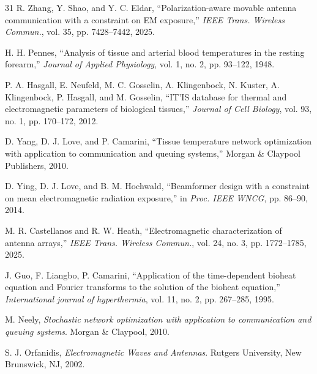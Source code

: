\documentclass[journal]{IEEEtran}
\begin{document}
\begin{thebibliography}{31}
R. Zhang, Y. Shao, and Y. C. Eldar, ``Polarization-aware movable antenna communication with a constraint on EM exposure,'' \emph{IEEE Trans. Wireless Commun.}, vol. 35, pp. 7428--7442, 2025.

H. H. Pennes, ``Analysis of tissue and arterial blood temperatures in the resting forearm,'' \emph{Journal of Applied Physiology}, vol. 1, no. 2, pp. 93--122, 1948.

P. A. Hasgall, E. Neufeld, M. C. Gosselin, A. Klingenbock, N. Kuster, A. Klingenbock, P. Hasgall, and M. Gosselin, ``IT'IS database for thermal and electromagnetic parameters of biological tissues,'' \emph{Journal of Cell Biology}, vol. 93, no. 1, pp. 170--172, 2012.

D. Yang, D. J. Love, and P. Camarini, ``Tissue temperature network optimization with application to communication and queuing systems,'' Morgan \& Claypool Publishers, 2010.

D. Ying, D. J. Love, and B. M. Hochwald, ``Beamformer design with a constraint on mean electromagnetic radiation exposure,'' in \emph{Proc. IEEE WNCG}, pp. 86--90, 2014.

M. R. Castellanos and R. W. Heath, ``Electromagnetic characterization of antenna arrays,'' \emph{IEEE Trans. Wireless Commun.}, vol. 24, no. 3, pp. 1772--1785, 2025.

J. Guo, F. Liangbo, P. Camarini, ``Application of the time-dependent bioheat equation and Fourier transforms to the solution of the bioheat equation,'' \emph{International journal of hyperthermia}, vol. 11, no. 2, pp. 267--285, 1995.

M. Neely, \emph{Stochastic network optimization with application to communication and queuing systems}. Morgan \& Claypool, 2010.

S. J. Orfanidis, \emph{Electromagnetic Waves and Antennas}. Rutgers University, New Brunswick, NJ, 2002.

\end{thebibliography}
\end{document}

